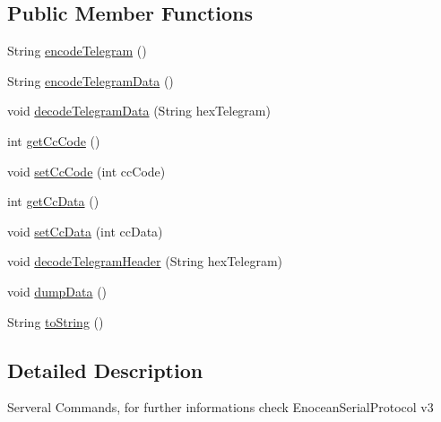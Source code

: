 \subsection*{Public Member Functions}
\begin{DoxyCompactItemize}
\item 
String \hyperlink{classch_1_1bfh_1_1gr33nopo55um_1_1enocean_1_1telegram_1_1_common_command_aa18085a594f76c4b1f347a1e4802d6e8}{encode\+Telegram} ()
\item 
String \hyperlink{classch_1_1bfh_1_1gr33nopo55um_1_1enocean_1_1telegram_1_1_common_command_aed721fbcd413ff06a6d6a6adbb9469e3}{encode\+Telegram\+Data} ()
\item 
void \hyperlink{classch_1_1bfh_1_1gr33nopo55um_1_1enocean_1_1telegram_1_1_common_command_a416a74c674f10644792359e1a8ac6806}{decode\+Telegram\+Data} (String hex\+Telegram)
\item 
int \hyperlink{classch_1_1bfh_1_1gr33nopo55um_1_1enocean_1_1telegram_1_1_common_command_a656267002ccb682736cef899964644ea}{get\+Cc\+Code} ()
\item 
void \hyperlink{classch_1_1bfh_1_1gr33nopo55um_1_1enocean_1_1telegram_1_1_common_command_aa7d557542800c865665fa823b14d0de3}{set\+Cc\+Code} (int cc\+Code)
\item 
int \hyperlink{classch_1_1bfh_1_1gr33nopo55um_1_1enocean_1_1telegram_1_1_common_command_af8547a42a014cd605d89e17ae4c80ef4}{get\+Cc\+Data} ()
\item 
void \hyperlink{classch_1_1bfh_1_1gr33nopo55um_1_1enocean_1_1telegram_1_1_common_command_ae14e058541169d29e06d1898b5095351}{set\+Cc\+Data} (int cc\+Data)
\item 
void \hyperlink{classch_1_1bfh_1_1gr33nopo55um_1_1enocean_1_1telegram_1_1_common_command_ab6665242c2dae33aae44ed241790ada8}{decode\+Telegram\+Header} (String hex\+Telegram)
\item 
void \hyperlink{classch_1_1bfh_1_1gr33nopo55um_1_1enocean_1_1telegram_1_1_common_command_a11403f33c18056309c71e2c3ff9e3e4a}{dump\+Data} ()
\item 
String \hyperlink{classch_1_1bfh_1_1gr33nopo55um_1_1enocean_1_1telegram_1_1_common_command_a0d6c632da164320eb0d0e1cc67cf2059}{to\+String} ()
\end{DoxyCompactItemize}


\subsection{Detailed Description}
Serveral Commands, for further informations check Enocean\+Serial\+Protocol v3

